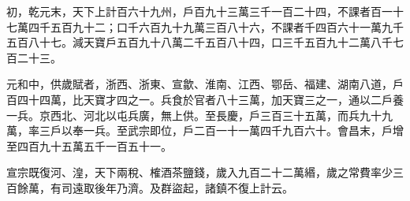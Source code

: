 \begin{pinyinscope}
 初，乾元末，天下上計百六十九州，戶百九十三萬三千一百二十四，不課者百一十七萬四千五百九十二；口千六百九十九萬三百八十六，不課者千四百六十一萬九千五百八十七。減天寶戶五百九十八萬二千五百八十四，口三千五百九十二萬八千七百二十三。



 元和中，供歲賦者，浙西、浙東、宣歙、淮南、江西、鄂岳、福建、湖南八道，戶百四十四萬，比天寶才四之一。兵食於官者八十三萬，加天寶三之一，通以二戶養一兵。京西北、河北以屯兵廣，無上供。至長慶，戶三百三十五萬，而兵九十九萬，率三戶以奉一兵。至武宗即位，戶二百一十一萬四千九百六十。會昌末，戶增至四百九十五萬五千一百五十一。



 宣宗既復河、湟，天下兩稅、榷酒茶鹽錢，歲入九百二十二萬緡，歲之常費率少三百餘萬，有司遠取後年乃濟。及群盜起，諸鎮不復上計云。



\end{pinyinscope}